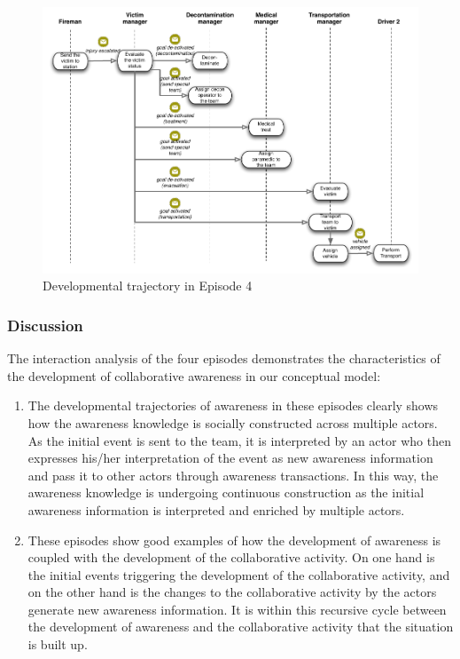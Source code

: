 \begin{figure}[htbp] %
   \centering
   \includegraphics[width=5.8in]{episode_4_interaction.pdf} 
   \caption{Developmental trajectory in Episode 4}
   \label{fig:episode_4_interaction}
\end{figure}
\subsubsection{Discussion} %
\label{ssub:discussion}
The interaction analysis of the four episodes demonstrates the characteristics of the development of collaborative awareness in our conceptual model:

\begin{enumerate}
	\item The developmental trajectories of awareness in these episodes clearly shows how the awareness knowledge is socially constructed across multiple actors. As the initial event is sent to the team, it is interpreted by an actor who then expresses his/her interpretation of the event as new awareness information and pass it to other actors through awareness transactions. In this way, the awareness knowledge is undergoing continuous construction as the initial awareness information is interpreted and enriched by multiple actors.
	\item These episodes show good examples of how the development of awareness is coupled with the development of the collaborative activity. On one hand is the initial events triggering the development of the collaborative activity, and on the other hand is the changes to the collaborative activity by the actors generate new awareness information. It is within this recursive cycle between the development of awareness and the collaborative activity that the situation is built up.
\end{enumerate}

